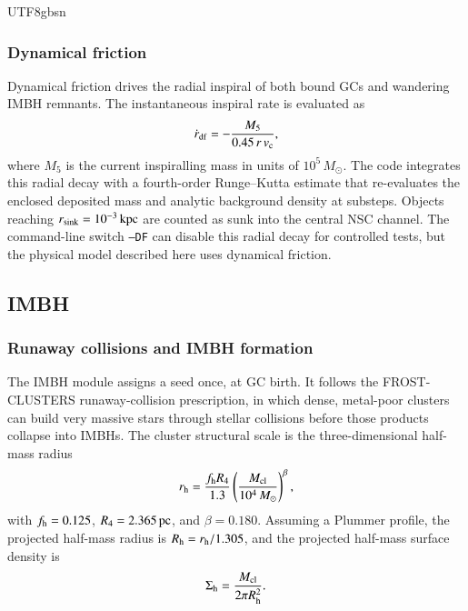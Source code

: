 \documentclass[trackchanges, twocolappendix, twocolumn]{aastex701}
\begin{document}
\begin{CJK*}{UTF8}{gbsn}
\subsubsection{Dynamical friction} \label{subsubsect:dynamical_friction}

Dynamical friction drives the radial inspiral of both bound GCs and wandering IMBH remnants. The instantaneous inspiral rate is evaluated as
\begin{equation}
\dot{r}_{\rm df}=-\frac{M_5}{0.45\,r\,v_{\rm c}},
\label{eq:dynamical_friction}
\end{equation}
where \(M_5\) is the current inspiralling mass in units of \(10^5\,M_{\odot}\). The code integrates this radial decay with a fourth-order Runge--Kutta estimate that re-evaluates the enclosed deposited mass and analytic background density at substeps. Objects reaching \(r_{\rm sink}=10^{-3}\,{\rm kpc}\) are counted as sunk into the central NSC channel. The command-line switch \texttt{--DF} can disable this radial decay for controlled tests, but the physical model described here uses dynamical friction.

\subsection{IMBH} \label{subsect:imbh}

\subsubsection{Runaway collisions and IMBH formation} \label{subsubsect:runaway_imbh}

The IMBH module assigns a seed once, at GC birth. It follows the FROST-CLUSTERS runaway-collision prescription, in which dense, metal-poor clusters can build very massive stars through stellar collisions before those products collapse into IMBHs. The cluster structural scale is the three-dimensional half-mass radius
\begin{equation}
r_{\rm h}=
\frac{f_{\rm h}R_4}{1.3}
\left(\frac{M_{\rm cl}}{10^4\,M_{\odot}}\right)^{\beta},
\label{eq:imbh_radius}
\end{equation}
with \(f_{\rm h}=0.125\), \(R_4=2.365\,{\rm pc}\), and \(\beta=0.180\). Assuming a Plummer profile, the projected half-mass radius is \(R_{\rm h}=r_{\rm h}/1.305\), and the projected half-mass surface density is
\begin{equation}
\Sigma_{\rm h}=\frac{M_{\rm cl}}{2\pi R_{\rm h}^2}.
\label{eq:imbh_sigma}
\end{equation}


\end{CJK*}
\end{document}
